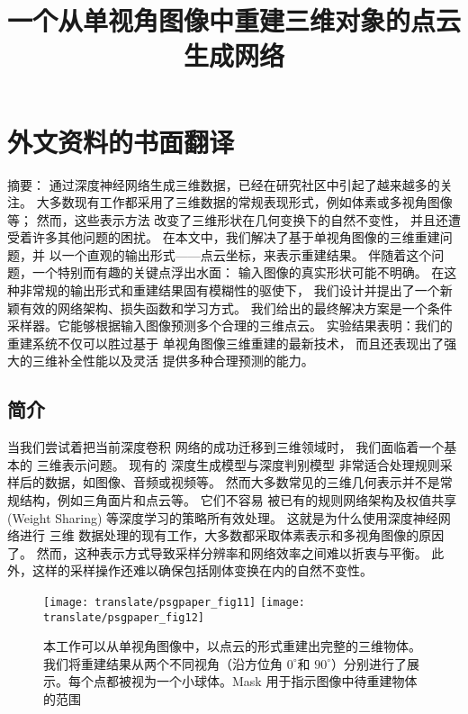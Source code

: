 \chapter{外文资料的书面翻译}
\label{chap:translate}

\title{一个从单视角图像中重建三维对象的点云生成网络}

{\heiti 摘要：}
通过深度神经网络生成三维数据，已经在研究社区中引起了越来越多的关注。
大多数现有工作都采用了三维数据的常规表现形式，例如体素或多视角图像等；
然而，这些表示方法%
改变了三维形状在几何变换下的自然不变性，
并且还遭受着许多其他问题的困扰。
在本文中，我们解决了基于单视角图像的三维重建问题，并
以一个直观的输出形式——点云坐标，来表示重建结果。
伴随着这个问题，一个特别而有趣的关键点浮出水面：
输入图像的真实形状可能不明确。
在这种非常规的输出形式和重建结果固有模糊性的驱使下，
我们设计并提出了一个新颖有效的网络架构、损失函数和学习方式。
我们给出的最终解决方案是一个条件采样器。它能够根据输入图像预测多个合理的三维点云。
实验结果表明：我们的重建系统不仅可以胜过基于
单视角图像三维重建的最新技术，
而且还表现出了强大的三维补全性能以及灵活
提供多种合理预测的能力。




\section{简介}
当我们尝试着把当前深度卷积%
网络的成功迁移到三维领域时，
我们面临着一个基本的%
三维表示问题。
现有的%
深度生成模型与深度判别模型%
非常适合处理规则采样后的数据，如图像、音频或视频等。
然而大多数常见的三维几何表示并不是常规结构，例如三角面片和点云等。
它们不容易%
被已有的规则网络架构及权值共享 (Weight Sharing) 等深度学习的策略所有效处理。
这就是为什么使用深度神经网络进行 三维 数据处理的现有工作，大多数都采取体素表示和多视角图像的原因了。 然而，这种表示方式导致采样分辨率和网络效率之间难以折衷与平衡。
此外，这样的采样操作还难以确保包括刚体变换在内的自然不变性。







\begin{figure}[h]
	\centering
	{\texttt{[image: translate/psgpaper\_fig11]}}
	{\texttt{[image: translate/psgpaper\_fig12]}}
	\caption[]{
	本工作可以从单视角图像中，以点云的形式重建出{\heiti 完整}的三维物体。
	我们将重建结果从两个不同视角（沿方位角 $0^\circ$和 $90^\circ$）分别进行了展示。每个点都被视为一个小球体。Mask 用于指示图像中待重建物体的范围}
\end{figure}





